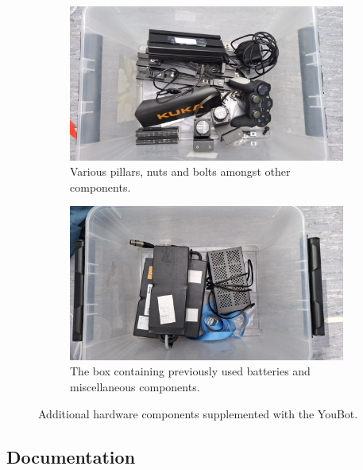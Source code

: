 \documentclass[a4paper, 12pt]{article}
\begin{document}
    
    \begin{figure}[H]
        \centering
        \begin{subfigure}[t]{0.49\linewidth}
            \centering
            \includegraphics[width=\linewidth]{images/sec2/box2.jpg}
            \caption{Various pillars, nuts and bolts amongst other components.}
        \end{subfigure}
        \hfill
        \begin{subfigure}[t]{0.49\linewidth}
            \centering
            \includegraphics[width=\linewidth]{images/sec2/box1.jpg}
            \caption{The box containing previously used batteries and miscellaneous components.}
        \end{subfigure}
        \caption{Additional hardware components supplemented with the YouBot.}
    \end{figure}

    \subsection{Documentation}
\end{document}
